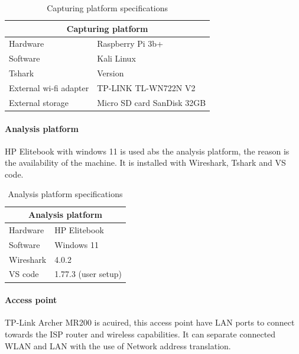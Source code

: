 \begin{table}[H]
\centering
\caption{Capturing platform specifications}
\label{tab:CapturingPlatfromSpec}
\begin{tabular}{|ll|}
\hline
\multicolumn{2}{|c|}{\textbf{Capturing platform}}                         \\ \hline
\multicolumn{1}{|l|}{Hardware}               & Raspberry Pi 3b+           \\ \hline
\multicolumn{1}{|l|}{Software}               & Kali Linux                 \\ \hline
\multicolumn{1}{|l|}{Tshark}                 & Version                    \\ \hline
\multicolumn{1}{|l|}{External wi-fi adapter} & TP-LINK TL-WN722N V2       \\ \hline
\multicolumn{1}{|l|}{External storage}       & Micro SD card SanDisk 32GB \\ \hline
\end{tabular}
\end{table}

\paragraph{Analysis platform}
HP Elitebook with windows 11 is used abs the analysis platform, the reason is the availability of the machine. It is installed with Wireshark, Tshark and VS code. 

\begin{table}[H]
\centering
\caption{Analysis platform specifications}
\label{tab:AnalysisPlatfromSpec}
\begin{tabular}{|ll|}
\hline
\multicolumn{2}{|c|}{\textbf{Analysis platform}}      \\ \hline
\multicolumn{1}{|l|}{Hardware}  & HP Elitebook        \\ \hline
\multicolumn{1}{|l|}{Software}  & Windows 11          \\ \hline
\multicolumn{1}{|l|}{Wireshark} & 4.0.2               \\ \hline
\multicolumn{1}{|l|}{VS code}   & 1.77.3 (user setup) \\ \hline
\end{tabular}
\end{table}

\paragraph{Access point}
TP-Link Archer MR200 is acuired, this access point have LAN ports to connect towards the ISP router and wireless capabilities. It can separate connected WLAN and LAN with the use of Network address translation. 


